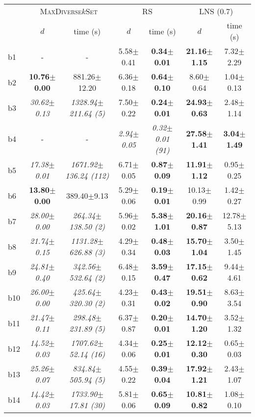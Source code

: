 \begin{longtable}{|l|c|c|c|c|c|c|}
\hline
&\multicolumn{2}{c|}{\textsc{MaxDiverse$k$Set}}&\multicolumn{2}{c|}{{RS}}&\multicolumn{2}{c|}{LNS (0.7)}\\
\cline{2-7}
&$d$&time (s)&$d$&time (s)&$d$&time (s)\\
\hline
b1&- & -&5.58$\pm$0.41 & \textbf{0.34$\pm$0.01}&\textbf{21.16$\pm$1.15} & 7.32$\pm$2.29
\\
b2&\textbf{10.76$\pm$0.00} & 881.26$\pm$12.20&6.36$\pm$0.18 & \textbf{0.64$\pm$0.10}&8.60$\pm$0.64 & 1.04$\pm$0.13
\\
b3&\textit{30.62$\pm$0.13} & \textit{1328.94$\pm$211.64 (5)}&7.50$\pm$0.22 & \textbf{0.24$\pm$0.01}&\textbf{24.93$\pm$0.63} & 2.48$\pm$1.14
\\
b4&- & -&\textit{2.94$\pm$0.05} & \textit{0.32$\pm$0.01 (91)}&\textbf{27.58$\pm$1.41} & \textbf{3.04$\pm$1.49}
\\
b5&\textit{17.38$\pm$0.01} & \textit{1671.92$\pm$136.24 (112)}&6.71$\pm$0.05 & \textbf{0.87$\pm$0.09}&\textbf{11.91$\pm$1.12} & 0.95$\pm$0.25
\\
b6&\textbf{13.80$\pm$0.00} & 389.40$\pm$9.13&5.29$\pm$0.06 & \textbf{0.19$\pm$0.01}&10.13$\pm$0.99 & 1.42$\pm$0.27
\\
b7&\textit{28.00$\pm$0.00} & \textit{264.34$\pm$138.50 (2)}&5.96$\pm$0.02 & \textbf{5.38$\pm$1.01}&\textbf{20.16$\pm$0.87} & 12.78$\pm$5.13
\\
b8&\textit{21.74$\pm$0.15} & \textit{1131.28$\pm$626.88 (3)}&4.29$\pm$0.34 & \textbf{0.48$\pm$0.03}&\textbf{15.70$\pm$1.04} & 3.50$\pm$1.45
\\
b9&\textit{24.81$\pm$0.40} & \textit{342.56$\pm$532.64 (2)}&6.48$\pm$0.15 & \textbf{3.59$\pm$0.47}&\textbf{17.15$\pm$0.62} & 9.44$\pm$4.61
\\
b10&\textit{26.00$\pm$0.00} & \textit{425.64$\pm$320.30 (2)}&4.23$\pm$0.31 & \textbf{0.43$\pm$0.02}&\textbf{19.51$\pm$0.90} & 8.63$\pm$3.54
\\
b11&\textit{21.47$\pm$0.11} & \textit{298.48$\pm$231.89 (5)}&6.37$\pm$0.87 & \textbf{0.20$\pm$0.01}&\textbf{14.70$\pm$1.20} & 3.52$\pm$1.32
\\
b12&\textit{14.52$\pm$0.03} & \textit{1707.62$\pm$52.14 (16)}&4.34$\pm$0.06 & \textbf{0.25$\pm$0.01}&\textbf{12.12$\pm$0.30} & 0.65$\pm$0.03
\\
b13&\textit{25.26$\pm$0.07} & \textit{834.84$\pm$505.94 (5)}&4.55$\pm$0.22 & \textbf{0.39$\pm$0.04}&\textbf{17.92$\pm$1.21} & 2.43$\pm$1.07
\\
b14&\textit{14.42$\pm$0.03} & \textit{1733.90$\pm$17.81 (30)}&5.81$\pm$0.06 & \textbf{0.65$\pm$0.09}&\textbf{10.81$\pm$0.82} & 1.08$\pm$0.10

\end{longtable}

